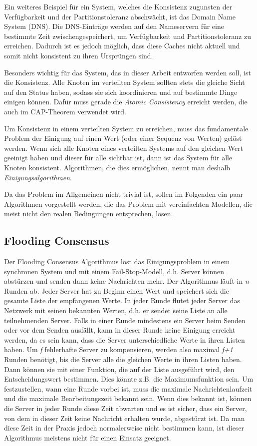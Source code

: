 Ein weiteres Beispiel für ein System, welches die Konsistenz zugunsten der Verfügbarkeit und der Partitionstoleranz abschwächt, ist das Domain Name System (DNS). Die DNS-Einträge werden auf den Nameservern für eine bestimmte Zeit zwischengespeichert, um Verfügbarkeit und Partitionstoleranz zu erreichen. Dadurch ist es jedoch möglich, dass diese Caches nicht aktuell und somit nicht konsistent zu ihren Ursprüngen sind.

Besonders wichtig für das System, das in dieser Arbeit entworfen werden soll, ist die Konsistenz. Alle Knoten im verteilten System sollten stets die gleiche Sicht auf den Status haben, sodass sie sich koordinieren und auf bestimmte Dinge einigen können. Dafür muss gerade die \textit{Atomic Consistency} erreicht werden, die auch im CAP-Theorem verwendet wird.

Um Konsistenz in einem verteilten System zu erreichen, muss das fundamentale Problem der Einigung auf einen Wert (oder einer Sequenz von Werten) gelöst werden. Wenn sich alle Knoten eines verteilten Systems auf den gleichen Wert geeinigt haben und dieser für alle sichtbar ist, dann ist das System für alle Knoten konsistent. Algorithmen, die dies ermöglichen, nennt man deshalb \textit{Einigungsalgorithmen}.

Da das Problem im Allgemeinen nicht trivial ist, sollen im Folgenden ein paar Algorithmen vorgestellt werden, die das Problem mit vereinfachten Modellen, die meist nicht den realen Bedingungen entsprechen, lösen.

\subsection{Flooding Consensus}

Der Flooding Consensus Algorithmus löst das Einigungsproblem in einem synchronen System und mit einem Fail-Stop-Modell, d.h. Server können abstürzen und senden dann keine Nachrichten mehr. Der Algorithmus läuft in \textit{n} Runden ab. Jeder Server hat zu Beginn einen Wert und speichert sich die gesamte Liste der empfangenen Werte. In jeder Runde flutet jeder Server das Netzwerk mit seinen bekannten Werten, d.h. er sendet seine Liste an alle teilnehmenden Server. Falls in einer Runde mindestens ein Server beim Senden oder vor dem Senden ausfällt, kann in dieser Runde keine Einigung erreicht werden, da es sein kann, dass die Server unterschiedliche Werte in ihren Listen haben. Um \textit{f} fehlerhafte Server zu kompensieren, werden also maximal \textit{f+1} Runden benötigt, bis die Server alle die gleichen Werte in ihren Listen haben. Dann können sie mit einer Funktion, die auf der Liste ausgeführt wird, den Entscheidungswert bestimmen. Dies könnte z.B. die Maximumsfunktion sein.
Um festzustellen, wann eine Runde vorbei ist, muss die maximale Nachrichtenlaufzeit und die maximale Bearbeitungszeit bekannt sein. Wenn dies bekannt ist, können die Server in jeder Runde diese Zeit abwarten und es ist sicher, dass ein Server, von dem in dieser Zeit keine Nachricht erhalten wurde, abgestürzt ist. Da man diese Zeit in der Praxis jedoch normalerweise nicht bestimmen kann, ist dieser Algorithmus meistens nicht für einen Einsatz geeignet.

